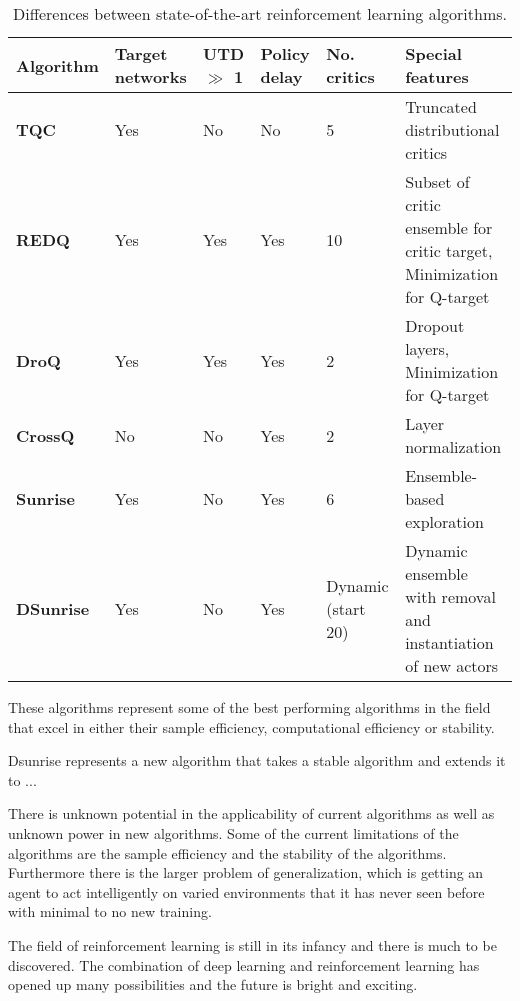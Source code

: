 \begin{table}[H]
    \footnotesize
    \centering
    \renewcommand{\arraystretch}{1.4} %
    \begin{tabularx}{\textwidth}{X | X X X X p{}}
        \hline
        \textbf{Algorithm} & \textbf{Target networks} & \textbf{UTD $\gg$ 1} & \textbf{Policy delay} & \textbf{No. critics} & \textbf{Special features} \\
        \hline
        \textbf{TQC}     & Yes & No  & No  & 5 & Truncated distributional critics \\
        \textbf{REDQ}    & Yes & Yes & Yes & 10 & Subset of critic ensemble for critic target, Minimization for Q-target \\
        \textbf{DroQ}    & Yes & Yes & Yes & 2 & Dropout layers, Minimization for Q-target \\
        \textbf{CrossQ}  & No  & No  & Yes & 2 & Layer normalization \\
        \textbf{Sunrise} & Yes & No  & Yes & 6 & Ensemble-based exploration \\
        \textbf{DSunrise} & Yes & No  & Yes & Dynamic (start 20) & Dynamic ensemble with removal and instantiation of new actors \\
        \hline
    \end{tabularx}
    \caption{Differences between state-of-the-art reinforcement learning algorithms.}
\end{table}

These algorithms represent some of the best performing algorithms in the field that excel in either their sample efficiency, computational efficiency or stability.

Dsunrise represents a new algorithm that takes a stable algorithm and extends it to ...


There is unknown potential in the applicability of current algorithms as well as unknown power in new algorithms. Some of the current limitations of the algorithms are the sample efficiency and the stability of the algorithms. Furthermore there is the larger problem of generalization, which is getting an agent to act intelligently on varied environments that it has never seen before with minimal to no new training.

The field of reinforcement learning is still in its infancy and there is much to be discovered. The combination of deep learning and reinforcement learning has opened up many possibilities and the future is bright and exciting.